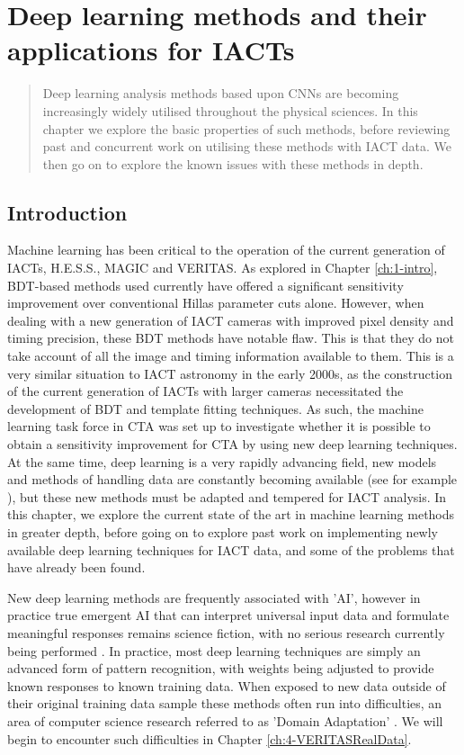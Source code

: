 \chapter{\label{ch:2-CNNs}Deep learning methods and their applications for IACTs}
\minitoc
\begin{abstract}
    Deep learning analysis methods based upon CNNs are becoming increasingly widely utilised throughout the physical sciences. In this chapter we explore the basic properties of such methods, before reviewing past and concurrent work on utilising these methods with IACT data. We then go on to explore the known issues with these methods in depth.
\end{abstract}

\section{Introduction}

Machine learning has been critical to the operation of the current generation of IACTs, H.E.S.S., MAGIC and VERITAS. As explored in Chapter \ref{ch:1-intro}, BDT-based methods used currently have offered a significant sensitivity improvement over conventional Hillas parameter cuts alone. However, when dealing with a new generation of IACT cameras with improved pixel density and timing precision, these BDT methods have notable flaw. This is that they do not take account of all the image and timing information available to them. This is a very similar situation to IACT astronomy in the early 2000s, as the construction of the current generation of IACTs with larger cameras necessitated the development of BDT and template fitting techniques. As such, the machine learning task force in CTA was set up to investigate whether it is possible to obtain a sensitivity improvement for CTA by using new deep learning techniques. At the same time, deep learning is a very rapidly advancing field, new models and methods of handling data are constantly becoming available (see for example \cite{adithesis}\cite{chebnet}), but these new methods must be adapted and tempered for IACT analysis. In this chapter, we explore the current state of the art in machine learning methods in greater depth, before going on to explore past work on implementing newly available deep learning techniques for IACT data, and some of the problems that have already been found. 

New deep learning methods are frequently associated with 'AI', however in practice true emergent AI that can interpret universal input data and formulate meaningful responses remains science fiction, with no serious research currently being performed \cite{emergent}. In practice, most deep learning techniques are simply an advanced form of pattern recognition, with weights being adjusted to provide known responses to known training data. When exposed to new data outside of their original training data sample these methods often run into difficulties, an area of computer science research referred to as 'Domain Adaptation' \cite{wilson}. We will begin to encounter such difficulties in Chapter \ref{ch:4-VERITASRealData}.


